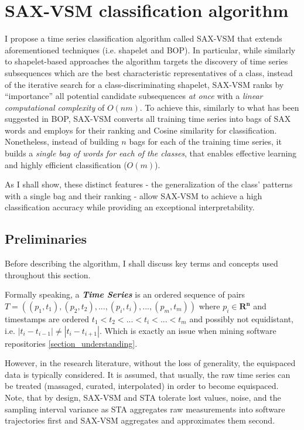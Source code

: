 \section{SAX-VSM classification algorithm} \label{sax_vsm_background}
I propose a time series classification algorithm called \mbox{SAX-VSM} that extends aforementioned techniques (i.e. shapelet and BOP). 
In particular, 
while similarly to shapelet-based approaches the algorithm targets the discovery of time series subsequences which 
are the best characteristic representatives of a class, 
instead of the iterative search for a class-discriminating shapelet, \mbox{SAX-VSM} ranks by “importance” all potential candidate 
subsequences \textit{at once} with a \textit{linear computational complexity} of $O(nm)$.
To achieve this, similarly to what has been suggested in BOP, \mbox{SAX-VSM} converts all training time series into bags of SAX 
words and employs \tfidf for their ranking and Cosine similarity for classification. 
Nonetheless, instead of building $n$ bags for each of the training time series, it builds a \textit{single bag of words for each of the classes}, 
that enables effective learning and highly efficient classification ($O(m)$).

As I shall show, these distinct features - the generalization of the class' patterns with a single bag and their ranking - allow 
SAX-VSM to achieve a high classification accuracy while providing an exceptional interpretability.

\subsection{Preliminaries}
Before describing the algorithm, I shall discuss key terms and concepts used throughout this section.
\begin{defn}\label{def_time_series}
Formally speaking, a \textbf{\textit{Time Series}} is an ordered sequence of pairs \linebreak
\mbox{$T=((p_{1},t_{1}),(p_{2},t_{2}),...,(p_{i},t_{i}),...,(p_{m},t_{m}))$} where $p_{i} \in \mathbf{R^{n}}$
and timestamps are ordered \linebreak 
$t_{1} < t_{2} < ... < t_{i} <...<t_{m}$ and possibly not equidistant, i.e. $|t_{i}-t_{i-1}| \neq |t_{i}-t_{i+1}|$.
Which is exactly an issue when mining software repositories \ref{section_understanding}.
\end{defn}
However, in the research literature, without the loss of generality, the equispaced data is typically considered.
It is assumed, that usually, the raw time series can be treated (massaged, curated, interpolated) in order to become equispaced.
Note, that by design, SAX-VSM and STA tolerate lost values, noise, and the sampling interval variance as STA aggregates raw 
measurements into software trajectories first and SAX-VSM aggregates and approximates them second.

